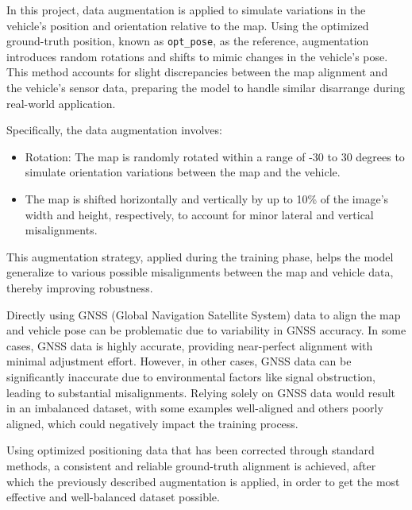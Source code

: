In this project, data augmentation is applied to simulate variations in the vehicle's position and orientation relative to the map. Using the optimized ground-truth position, known as \texttt{opt\_pose}, as the reference, augmentation introduces random rotations and shifts to mimic changes in the vehicle’s pose. This method accounts for slight discrepancies between the map alignment and the vehicle’s sensor data, preparing the model to handle similar disarrange during real-world application.

Specifically, the data augmentation involves:
\begin{itemize}
    \item Rotation: The map is randomly rotated within a range of -30 to 30 degrees to simulate orientation variations between the map and the vehicle.
    \item The map is shifted horizontally and vertically by up to 10\% of the image’s width and height, respectively, to account for minor lateral and vertical misalignments.
\end{itemize}

This augmentation strategy, applied during the training phase, helps the model generalize to various possible misalignments between the map and vehicle data, thereby improving robustness.

Directly using GNSS (Global Navigation Satellite System) data to align the map and vehicle pose can be problematic due to variability in GNSS accuracy. In some cases, GNSS data is highly accurate, providing near-perfect alignment with minimal adjustment effort. However, in other cases, GNSS data can be significantly inaccurate due to environmental factors like signal obstruction, leading to substantial misalignments. Relying solely on GNSS data would result in an imbalanced dataset, with some examples well-aligned and others poorly aligned, which could negatively impact the training process.

Using optimized positioning data that has been corrected through standard methods, a consistent and reliable ground-truth alignment is achieved, after which the previously described augmentation is applied, in order to get the most effective and well-balanced dataset possible.

